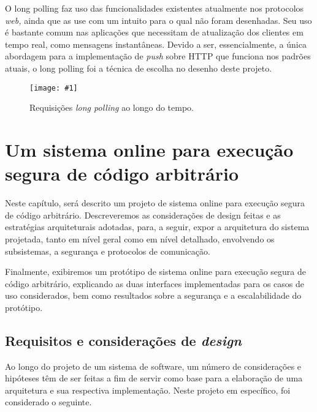 \documentclass[ruledheader, 12pt]{abnt}
\newcommand{\figcustom}[4]{\par
	\begin{figure}[#3]
		\centering
		\texttt{[image: \#1]}
		\caption{\label{fig:#1}#2}
	\end{figure}
\par}
\begin{document}
O long polling faz uso das funcionalidades existentes atualmente nos protocolos \emph{web,} ainda que as use com um intuito para o qual não foram desenhadas. Seu uso é bastante comum nas aplicações que necessitam de atualização dos clientes em tempo real, como mensagens instantâneas. Devido a ser, essencialmente, a única abordagem para a implementação de \emph{push} sobre HTTP que funciona nos padrões atuais, o long polling foi a técnica de escolha no desenho deste projeto.

\figcustom{webmodel-longpolling}{Requisições \emph{long polling} ao longo do tempo.}{tp}{.8}









\chapter{Um sistema online para execução segura de código arbitrário}

Neste capítulo, será descrito um projeto de sistema online para execução segura de código arbitrário. Descreveremos as considerações de design feitas e as estratégias arquiteturais adotadas, para, a seguir, expor a arquitetura do sistema projetada, tanto em nível geral como em nível detalhado, envolvendo os subsistemas, a segurança e protocolos de comunicação.

Finalmente, exibiremos um protótipo de sistema online para execução segura de código arbitrário, explicando as duas interfaces implementadas para os casos de uso considerados, bem como resultados sobre a segurança e a escalabilidade do protótipo.

\section{Requisitos e considerações de \emph{design}}

Ao longo do projeto de um sistema de software, um número de considerações e hipóteses têm de ser feitas a fim de servir como base para a elaboração de uma arquitetura e sua respectiva implementação. Neste projeto em específico, foi considerado o seguinte.
\end{document}

